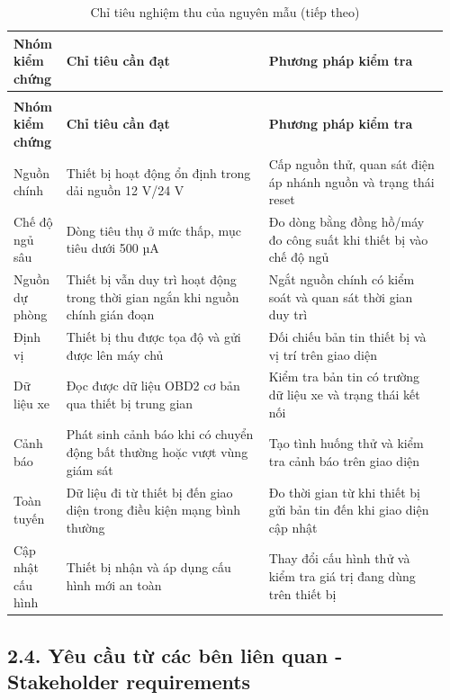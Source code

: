 \documentclass[a4paper]{extarticle}
\newcommand{\thesissettableid}[2]{%
  \renewcommand{\thetable}{#1}%
  \renewcommand{\theHtable}{#2}%
}
\begin{document}
{\thesissettableid{2.7}{condensed-bang-2-7-chi-tieu-nghiem-thu-cua-nguyen-mau}
\def\LTcaptype{table}
\begin{longtable}{|L{0.104\linewidth}|L{0.45\linewidth}|L{0.405\linewidth}|}
\caption{Chỉ tiêu nghiệm thu của nguyên mẫu}\label{tab:condensed-bang-2-7-chi-tieu-nghiem-thu-cua-nguyen-mau}\\
\hline
\textbf{Nhóm kiểm chứng} & \textbf{Chỉ tiêu cần đạt} & \textbf{Phương pháp kiểm tra} \\
\hline
\endfirsthead
\caption[]{Chỉ tiêu nghiệm thu của nguyên mẫu (tiếp theo)}\\
\hline
\textbf{Nhóm kiểm chứng} & \textbf{Chỉ tiêu cần đạt} & \textbf{Phương pháp kiểm tra} \\
\hline
\endhead
\endfoot
\endlastfoot
Nguồn chính & Thiết bị hoạt động ổn định trong dải nguồn 12 V/24 V & Cấp nguồn thử, quan sát điện áp nhánh nguồn và trạng thái reset \\\hline
Chế độ ngủ sâu & Dòng tiêu thụ ở mức thấp, mục tiêu dưới 500 µA & Đo dòng bằng đồng hồ/máy đo công suất khi thiết bị vào chế độ ngủ \\\hline
Nguồn dự phòng & Thiết bị vẫn duy trì hoạt động trong thời gian ngắn khi nguồn chính gián đoạn & Ngắt nguồn chính có kiểm soát và quan sát thời gian duy trì \\\hline
Định vị & Thiết bị thu được tọa độ và gửi được lên máy chủ & Đối chiếu bản tin thiết bị và vị trí trên giao diện \\\hline
Dữ liệu xe & Đọc được dữ liệu OBD2 cơ bản qua thiết bị trung gian & Kiểm tra bản tin có trường dữ liệu xe và trạng thái kết nối \\\hline
Cảnh báo & Phát sinh cảnh báo khi có chuyển động bất thường hoặc vượt vùng giám sát & Tạo tình huống thử và kiểm tra cảnh báo trên giao diện \\\hline
Toàn tuyến & Dữ liệu đi từ thiết bị đến giao diện trong điều kiện mạng bình thường & Đo thời gian từ khi thiết bị gửi bản tin đến khi giao diện cập nhật \\\hline
Cập nhật cấu hình & Thiết bị nhận và áp dụng cấu hình mới an toàn & Thay đổi cấu hình thử và kiểm tra giá trị đang dùng trên thiết bị \\\hline
\end{longtable}
}

\subsection{2.4. Yêu cầu từ các bên liên quan - Stakeholder requirements}\label{yuxeau-cux1ea7u-tux1eeb-cuxe1c-buxean-liuxean-quan---stakeholder-requirements}
\end{document}
